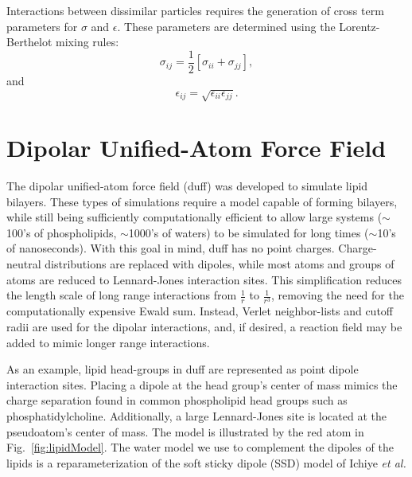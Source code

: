 \documentclass[]{book}
\begin{document}
Interactions between dissimilar particles requires the generation of
cross term parameters for $\sigma$ and $\epsilon$. These parameters
are determined using the Lorentz-Berthelot mixing
rules:\cite{Allen87}
\begin{equation}
\sigma_{ij} = \frac{1}{2}[\sigma_{ii} + \sigma_{jj}],
\label{eq:sigmaMix}
\end{equation}
and
\begin{equation}
\epsilon_{ij} = \sqrt{\epsilon_{ii} \epsilon_{jj}}.
\label{eq:epsilonMix}
\end{equation}

\section{\label{section:DUFF}Dipolar Unified-Atom Force Field}

The dipolar unified-atom force field ({\sc duff}) was developed to
simulate lipid bilayers. These types of simulations require a model
capable of forming bilayers, while still being sufficiently
computationally efficient to allow large systems ($\sim$100's of
phospholipids, $\sim$1000's of waters) to be simulated for long times
($\sim$10's of nanoseconds). With this goal in mind, {\sc duff} has no
point charges. Charge-neutral distributions are replaced with dipoles,
while most atoms and groups of atoms are reduced to Lennard-Jones
interaction sites. This simplification reduces the length scale of
long range interactions from $\frac{1}{r}$ to $\frac{1}{r^3}$,
removing the need for the computationally expensive Ewald
sum. Instead, Verlet neighbor-lists and cutoff radii are used for the
dipolar interactions, and, if desired, a reaction field may be added
to mimic longer range interactions.

As an example, lipid head-groups in {\sc duff} are represented as
point dipole interaction sites.  Placing a dipole at the head group's
center of mass mimics the charge separation found in common
phospholipid head groups such as phosphatidylcholine.\cite{Cevc87}
Additionally, a large Lennard-Jones site is located at the
pseudoatom's center of mass. The model is illustrated by the red atom
in Fig.~\ref{fig:lipidModel}. The water model we use to
complement the dipoles of the lipids is a
reparameterization\cite{fennell04} of the soft sticky dipole (SSD)
model of Ichiye
\emph{et al.}\cite{liu96:new_model}
\end{document}
